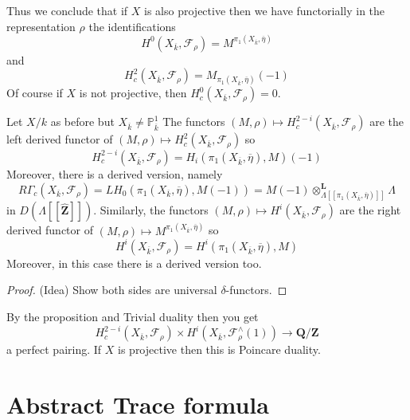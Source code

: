 \begin{remark}
\label{remark-projective}
Thus we conclude that if $X$ is also projective then
we have functorially in the representation $\rho$
the identifications
$$
H^0(X_{\overline k}, \mathcal{F}_\rho) =
M^{\pi_1(X_{\overline k}, \overline\eta)}
$$
and
$$
H_c^2(X_{\overline k}, \mathcal{F}_\rho) =
M_{\pi_1(X_{\overline k}, \overline \eta)}(-1)
$$
Of course if $X$ is not projective, then
$H^0_c(X_{\overline{k}}, \mathcal{F}_\rho) = 0$.
\end{remark}
	
	
\begin{proposition}
\label{proposition-curve-kpi1}
Let $X/k$ as before but $X_{\overline k}\neq \mathbb P^1_{\overline k}$ 
The functors
$
(M, \rho)\mapsto H_c^{2-i}(X_{\overline k}, \mathcal{F}_\rho)
$
are the left derived functor of
$(M, \rho)\mapsto H_c^2(X_{\overline k}, \mathcal{F}_\rho)$
so
$$
H_c^{2-i}(X_{\overline k},\mathcal{F}_\rho) =
H_i(\pi_1(X_{\overline k}, \overline \eta), M)(-1)
$$
Moreover, there is a derived version, namely
$$
R\Gamma_c(X_{\overline k}, \mathcal{F}_\rho)
=
LH_0(\pi_1(X_{\overline k}, \overline \eta), M(-1))
=
M(-1)
\otimes_{\Lambda[[\pi_1(X_{\overline k}, \overline \eta)]]}^\mathbf{L}
\Lambda
$$
in $D(\Lambda[[\widehat{\mathbf{Z}}]])$.
Similarly, the functors
$(M, \rho)\mapsto H^i(X_{\overline k}, \mathcal{F}_\rho)$
are the right derived functor of 
$(M, \rho)\mapsto M^{\pi_1(X_{\overline k}, \overline \eta)}$
so 
$$
H^i(X_{\overline k}, \mathcal{F}_\rho) =
H^i(\pi_1(X_{\overline k}, \overline \eta), M)
$$
Moreover, in this case there is a derived version too.
\end{proposition}

\begin{proof}
(Idea) Show both sides are universal $\delta$-functors.
\end{proof}

\begin{remark}
By the proposition and Trivial duality then you get
$$
H^{2-i}_c(X_{\overline k}, \mathcal{F}_\rho)
\times
H^i(X_{\overline k}, \mathcal{F}_\rho^\wedge(1))
\to
\mathbf{Q}/\mathbf{Z}
$$
a perfect pairing. If $X$ is projective then this is Poincare duality.
\end{remark}

\section{Abstract Trace formula}
\label{section-abstract-trace-formula}

